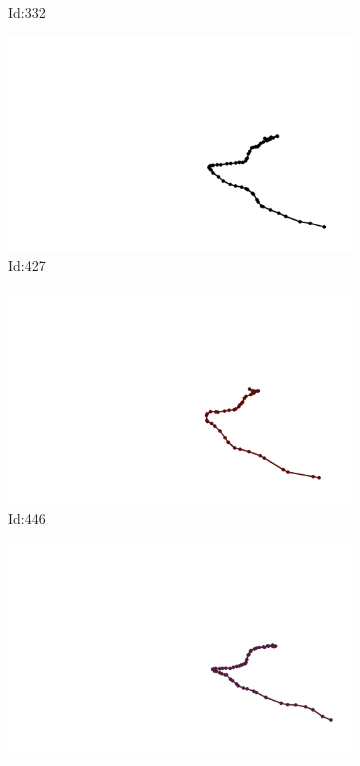 \documentclass[12pt,twoside]{report}
\begin{document}
\begin{figure}
\begin{subfigure}[b]{0.20\textwidth}
\caption{Id:332}
\end{subfigure}
\begin{subfigure}[b]{0.20\textwidth}
\centering
\includegraphics[width=\textwidth]{../trajectories/427.png}
\caption{Id:427}
\end{subfigure}
\begin{subfigure}[b]{0.20\textwidth}
\centering
\includegraphics[width=\textwidth]{../trajectories/446.png}
\caption{Id:446}
\end{subfigure}
\begin{subfigure}[b]{0.20\textwidth}
\centering
\includegraphics[width=\textwidth]{../trajectories/484.png}

\end{subfigure}
\end{figure}
\end{document}
